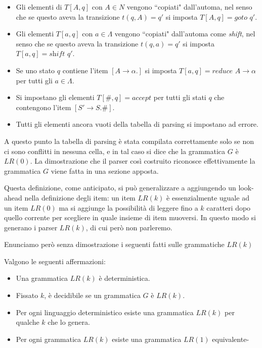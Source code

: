 \documentclass[12pt]{article}
\numberwithin{theorem}{subsection}
\begin{document}
\begin{itemize}
	\item Gli elementi di $T[A, q]$ con $A \in N$ vengono ``copiati" dall'automa, nel senso che se questo aveva la transizione $t(q, A) = q'$ si imposta $T[A, q] = \textit{goto } q'$.
	\item Gli elementi $T[a, q]$ con $a \in \Lambda$ vengono ``copiati" dall'automa come \textit{shift}, nel senso che se questo aveva la transizione $t(q, a) = q'$ si imposta $T[a, q] = \textit{shift } q'$.
	\item Se uno stato $q$ contiene l'item $[ A \rightarrow \alpha . ]$ si imposta $T[a, q] = \textit{reduce } A \rightarrow \alpha$ per tutti gli $a \in \Lambda$.
	\item Si impostano gli elementi $T[\#, q] = \textit{accept}$ per tutti gli stati $q$ che contengono l'item $[ S' \rightarrow S. \# ]$.
	\item Tutti gli elementi ancora vuoti della tabella di parsing si impostano ad errore.
\end{itemize}

A questo punto la tabella di parsing è stata compilata correttamente solo se non ci sono conflitti in nessuna cella, e in tal caso si dice che la grammatica $G$ è $LR(0)$. La dimostrazione che il parser così costruito riconosce effettivamente la grammatica $G$ viene fatta in una sezione apposta.

Questa definizione, come anticipato, si può generalizzare a aggiungendo un look-ahead nella definizione degli item: un item $LR(k)$ è essenzialmente uguale ad un item $LR(0)$ ma si aggiunge la possibilità di leggere  fino a $k$ caratteri dopo quello corrente per scegliere in quale insieme di item muoversi. In questo modo si generano i parser $LR(k)$, di cui però non parleremo.

Enunciamo però senza dimostrazione i seguenti fatti sulle grammatiche $LR(k)$
\begin{theorem}
	Valgono le seguenti affermazioni:
	\begin{itemize}
		\item Una grammatica $LR(k)$ è deterministica.
		\item Fissato $k$, è decidibile se un grammatica $G$ è $LR(k)$.
		\item Per ogni linguaggio deterministico esiste una grammatica $LR(k)$ per qualche $k$ che lo genera.
		\item Per ogni grammatica $LR(k)$ esiste una grammatica $LR(1)$ equivalente-
	\end{itemize}
\end{theorem}
\end{document}
